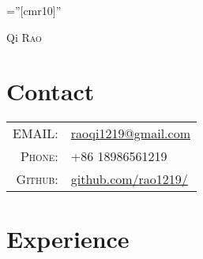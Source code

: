 \documentclass[a4paper,10pt]{article}
\begin{document}

\pagestyle{empty} %

\font\fb=''[cmr10]'' %

\par{\centering
		{\Huge Qi \textsc{Rao}
	}\bigskip\par}

\section{Contact}

\begin{tabular}{rl}
    \textsc{EMAIL:} & \href{mailto:raoqi1219@gmail.com}{raoqi1219@gmail.com}\\
    \textsc{Phone:}     & +86 18986561219\\
    \textsc{Github:}     & \href{https://github.com/rao1219/}{github.com/rao1219/}
\end{tabular}

\section{Experience}
\end{document}
